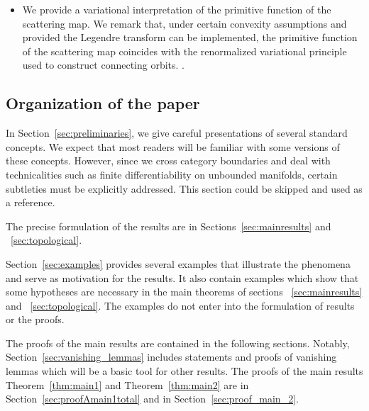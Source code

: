 \documentclass[11pt]{amsart}
\theoremstyle{definition}
\theoremstyle{remark}
\numberwithin{equation}{section}
\begin{document}
\begin{itemize}
     The theory behind these formulas, in the case of unbounded manifolds, presents some notable differences from that of bounded manifolds, which are commonly considered in symplectic systems. As we pointed out,
     there are different action forms corresponding to gauge transformations.
    The gauges chosen can affect the convergence of the series.

    When either the orbit asymptotic in the future or the orbit
    asymptotic in the past
     escape to $\infty$ (i.e., the orbit leaves any compact set after a finite
     number of steps), we show that there are (rather explicit)
     gauges where the series converges, and  there are also
     gauges that make  the series  divergent.

   \item
     We provide a variational interpretation of the primitive function of the scattering map.
     We remark that, under certain convexity assumptions and provided the Legendre transform can be implemented, the primitive function of the scattering map coincides with the renormalized variational principle used to construct connecting orbits. \cite{Rabinowitz08,Bessi96}.
\end{itemize}


   \subsection{Organization of the paper}

   In Section~\ref{sec:preliminaries},
   we give careful presentations of several standard concepts.
   We expect that most readers will be familiar with some versions of these concepts.
   However, since we cross category boundaries and deal with technicalities such as finite differentiability on unbounded manifolds, certain subtleties must be explicitly addressed. This section could be skipped and used as a reference.

   The precise formulation of the results are in Sections~\ref{sec:mainresults} and ~\ref{sec:topological}.

   Section~\ref{sec:examples} provides several examples that illustrate the phenomena and serve as motivation for the results. It also contain examples which show that some hypotheses are necessary in the main theorems of sections ~\ref{sec:mainresults} and ~\ref{sec:topological}.
    The examples do not enter into the formulation of results or the proofs.

   The proofs of the main results
   are contained in the following sections. Notably, Section~\ref{sec:vanishing_lemmas}
 includes statements and proofs of vanishing lemmas which
 will be a basic tool for other results.
 The proofs of the main results Theorem~\ref{thm:main1} and
 Theorem~\ref{thm:main2} are in Section~\ref{sec:proofAmain1total}
 and in Section~\ref{sec:proof_main_2}.
\end{document}
